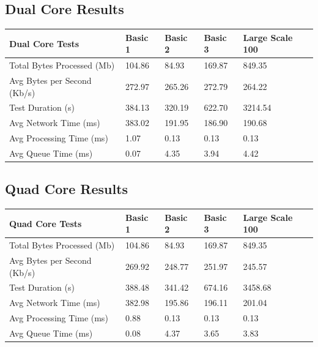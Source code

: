 \newpage
\subsection{Dual Core Results}

\begin{table}[!ht]
    \centering
    \begin{tabular}{|l|l|l|l|l|}
    \hline
        Dual Core Tests & Basic 1 & Basic 2 & Basic 3 & Large Scale 100 \\ \hline
        Total Bytes Processed (Mb) & 104.86 & 84.93 & 169.87 & 849.35 \\ \hline
        Avg Bytes per Second (Kb/s) & 272.97 & 265.26 & 272.79 & 264.22 \\ \hline
        Test Duration (s) & 384.13 & 320.19 & 622.70 & 3214.54 \\ \hline
        Avg Network Time (ms) & 383.02 & 191.95 & 186.90 & 190.68 \\ \hline
        Avg Processing Time (ms) & 1.07 & 0.13 & 0.13 & 0.13 \\ \hline
        Avg Queue Time (ms) & 0.07 & 4.35 & 3.94 & 4.42 \\ \hline
    \end{tabular}
\end{table}

\newpage
\subsection{Quad Core Results}

\begin{table}[!ht]
    \centering
    \begin{tabular}{|l|l|l|l|l|}
    \hline
        Quad Core Tests & Basic 1 & Basic 2 & Basic 3 & Large Scale 100 \\ \hline
        Total Bytes Processed (Mb) & 104.86 & 84.93 & 169.87 & 849.35 \\ \hline
        Avg Bytes per Second (Kb/s) & 269.92 & 248.77 & 251.97 & 245.57 \\ \hline
        Test Duration (s) & 388.48 & 341.42 & 674.16 & 3458.68 \\ \hline
        Avg Network Time (ms) & 382.98 & 195.86 & 196.11 & 201.04 \\ \hline
        Avg Processing Time (ms) & 0.88 & 0.13 & 0.13 & 0.13 \\ \hline
        Avg Queue Time (ms) & 0.08 & 4.37 & 3.65 & 3.83 \\ \hline
    \end{tabular}
\end{table}

